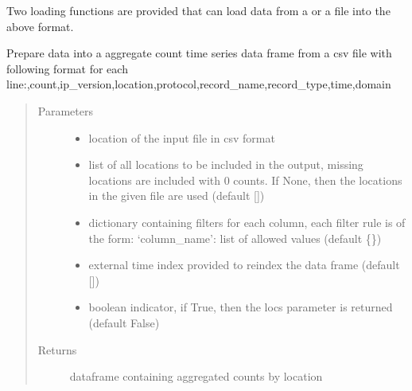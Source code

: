 \documentclass[letterpaper,10pt,english]{sphinxmanual}
\begin{document}
Two loading functions are provided that can load data from a  or a  file into the above format.

\begin{fulllineitems}
\label{\detokenize{manual:dnspredict.prepData}}
Prepare data into a aggregate count time series data frame from a csv file with following format for each line:,count,ip\_version,location,protocol,record\_name,record\_type,time,domain
\begin{quote}\begin{description}
\item[{Parameters}] \leavevmode\begin{itemize}
\item {} 
 \textendash{} location of the input file in csv format

\item {} 
 \textendash{} list of all locations to be included in the output, missing locations are included with 0 counts. If None, then the locations in the given file are used (default \sphinxhyphen{} {[}{]})

\item {} 
 \textendash{} dictionary containing filters for each column, each filter rule is of the form: ‘column\_name’: list of allowed values (default \sphinxhyphen{} \{\})

\item {} 
 \textendash{} external time index provided to reindex the data frame (default \sphinxhyphen{} {[}{]})

\item {} 
 \textendash{} boolean indicator, if True, then the locs parameter is returned (default \sphinxhyphen{} False)

\end{itemize}

\item[{Returns}] \leavevmode
dataframe containing aggregated counts by location

\end{description}\end{quote}

\end{fulllineitems}
\end{document}
